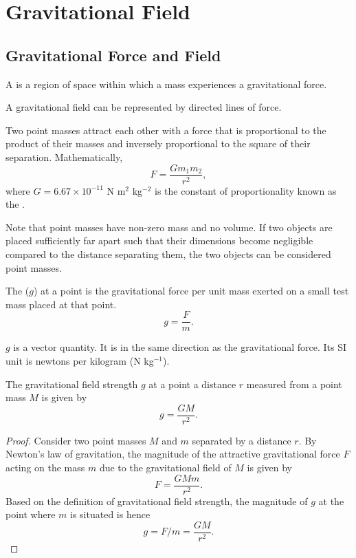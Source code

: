 \chapter{Gravitational Field}

\section{Gravitational Force and Field}

\begin{definition}
    A  is a region of space within which a mass experiences a gravitational force.
\end{definition}

A gravitational field can be represented by directed lines of force.

\begin{law}
    Two point masses attract each other with a force that is proportional to the product of their masses and inversely proportional to the square of their separation. Mathematically, \[F = \frac{G m_1 m_2}{r^2},\] where $G = 6.67 \times 10^{-11}$ N m$^2$ kg$^{-2}$ is the constant of proportionality known as the .
\end{law}

Note that point masses have non-zero mass and no volume. If two objects are placed sufficiently far apart such that their dimensions become negligible compared to the distance separating them, the two objects can be considered point masses.

\begin{definition}
    The  ($g$) at a point is the gravitational force per unit mass exerted on a small test mass placed at that point. \[g = \frac{F}{m}.\]
\end{definition}

$g$ is a vector quantity. It is in the same direction as the gravitational force. Its SI unit is newtons per kilogram (N kg$^{-1}$).

\begin{proposition}
    The gravitational field strength $g$ at a point a distance $r$ measured from a point mass $M$ is given by \[g = \frac{GM}{r^2}.\]
\end{proposition}
\begin{proof}
    Consider two point masses $M$ and $m$ separated by a distance $r$. By Newton's law of gravitation, the magnitude of the attractive gravitational force $F$ acting on the mass $m$ due to the gravitational field of $M$ is given by \[F = \frac{GMm}{r^2}.\] Based on the definition of gravitational field strength, the magnitude of $g$ at the point where $m$ is situated is hence \[g = F/m = \frac{GM}{r^2}.\]
\end{proof}

